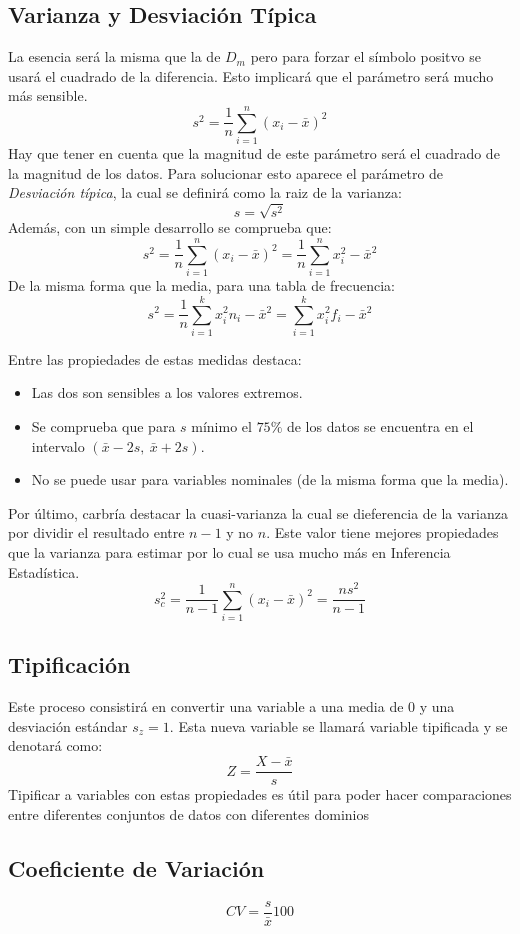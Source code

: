\documentclass[10pt,a4paper]{book}
\begin{document}
\subsection{Varianza y Desviación Típica}
La esencia será la misma que la de $D_m$ pero para forzar el símbolo positvo se usará el cuadrado de la diferencia. Esto implicará que el parámetro será mucho más sensible.
\[s^2 = \frac1{n}\sum_{i=1}^n(x_i-\bar x)^2\]
Hay que tener en cuenta que la magnitud de este parámetro será el cuadrado de la magnitud de los datos. Para solucionar esto aparece el parámetro de \textit{Desviación típica}, la cual se definirá como la raiz de la varianza: \[s=\sqrt{s^2}\]
Además, con un simple desarrollo se comprueba que:
\[s^2 = \frac1{n}\sum_{i=1}^n(x_i-\bar x)^2 = \frac1{n}\sum_{i=1}^n x_i^2-\bar x ^2\]
De la misma forma que la media, para una tabla de frecuencia: 
\[s^2 =\frac1n\sum_{i=1}^kx_i^2n_i-\bar x^2 = \sum_{i=1}^kx_i^2f_i-\bar x^2\]

Entre las propiedades de estas medidas destaca:
\begin{itemize}
	\item Las dos son sensibles a los valores extremos.
	\item Se comprueba que para $s$ mínimo el $75\%$ de los datos se encuentra en el intervalo $(\bar x -2s,\:\bar x+2s)$.
	\item No se puede usar para variables nominales (de la misma forma que la media).
\end{itemize}
Por último, carbría destacar la cuasi-varianza la cual se dieferencia de la varianza por dividir el resultado entre $n-1$ y no $n$. Este valor tiene mejores propiedades que la varianza para estimar por lo cual se usa mucho más en Inferencia Estadística.
\[s_c^2 = \frac1{n-1}\sum_{i=1}^n(x_i-\bar x)^2 = \frac{ns^2}{n-1}\]
\subsection{Tipificación}
Este proceso consistirá en convertir una variable a una media de $0$ y una desviación estándar $s_z = 1$. Esta nueva variable se llamará variable tipificada y se denotará como: 
\[Z=\frac{X-\bar x}{s}\]
Tipificar a variables con estas propiedades es útil para poder hacer comparaciones entre diferentes conjuntos de datos con diferentes dominios
\subsection{Coeficiente de Variación}
\[CV=\frac s{\bar x} 100\]
\end{document}
